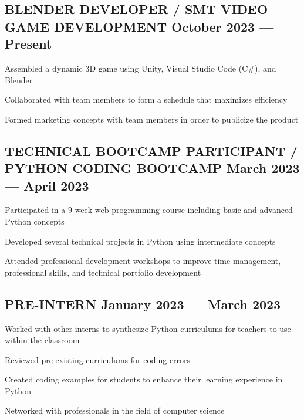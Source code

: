 \subsection{{BLENDER DEVELOPER / SMT VIDEO GAME DEVELOPMENT \hfill October 2023 --- Present}}
\begin{zitemize}
\item Assembled a dynamic 3D game using Unity, Visual Studio Code (C\#), and Blender
\item Collaborated with team members to form a schedule that maximizes efficiency
\item Formed marketing concepts with team members in order to publicize the product
\end{zitemize}

\subsection{{TECHNICAL BOOTCAMP PARTICIPANT / PYTHON CODING BOOTCAMP \hfill March 2023 --- April 2023}}
\begin{zitemize}
\item Participated in a 9-week web programming course including basic and advanced Python concepts
\item Developed several technical projects in Python using intermediate concepts
\item Attended professional development workshops to improve time management, professional skills, and technical portfolio development 
\end{zitemize}

\subsection{{PRE-INTERN \hfill January 2023 --- March 2023}}
\begin{zitemize}
\item Worked with other interns to synthesize Python curriculums for teachers to use within the classroom
\item Reviewed pre-existing curriculums for coding errors
\item Created coding examples for students to enhance their learning experience in Python
\item Networked with professionals in the field of computer science
\end{zitemize}

